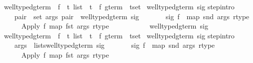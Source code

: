 \begin{isabellebody}
\isanewline
\isanewline
{}\ well{\isacharunderscore}typed{\isacharunderscore}gterm\ {\isacharcolon}{\isacharcolon}\ {\isachardoublequote}{\isacharparenleft}{\isacharprime}f\ {\isasymRightarrow}\ {\isacharprime}t\ list\ {\isacharasterisk}\ {\isacharprime}t{\isacharparenright}\ {\isasymRightarrow}\ {\isacharparenleft}{\isacharprime}f\ gterm\ {\isacharasterisk}\ {\isacharprime}t{\isacharparenright}set{\isachardoublequote}\isanewline
{}\ {\isachardoublequote}well{\isacharunderscore}typed{\isacharunderscore}gterm\ sig{\isachardoublequote}\isanewline
{}\isanewline
step{\isacharbrackleft}intro{\isacharbang}{\isacharbrackright}{\isacharcolon}\ \isanewline
\ \ \ \ {\isachardoublequote}{\isasymlbrakk}{\isasymforall}pair\ {\isasymin}\ set\ args{\isachardot}\ pair\ {\isasymin}\ well{\isacharunderscore}typed{\isacharunderscore}gterm\ sig{\isacharsemicolon}\ \isanewline
\ \ \ \ \ \ sig\ f\ {\isacharequal}\ {\isacharparenleft}map\ snd\ args{\isacharcomma}\ rtype{\isacharparenright}{\isasymrbrakk}\isanewline
\ \ \ \ \ {\isasymLongrightarrow}\ {\isacharparenleft}Apply\ f\ {\isacharparenleft}map\ fst\ args{\isacharparenright}{\isacharcomma}\ rtype{\isacharparenright}\ \isanewline
\ \ \ \ \ \ \ \ \ {\isasymin}\ well{\isacharunderscore}typed{\isacharunderscore}gterm\ sig{\isachardoublequote}\isanewline
\isanewline
{}\ well{\isacharunderscore}typed{\isacharunderscore}gterm{\isacharprime}\ {\isacharcolon}{\isacharcolon}\ {\isachardoublequote}{\isacharparenleft}{\isacharprime}f\ {\isasymRightarrow}\ {\isacharprime}t\ list\ {\isacharasterisk}\ {\isacharprime}t{\isacharparenright}\ {\isasymRightarrow}\ {\isacharparenleft}{\isacharprime}f\ gterm\ {\isacharasterisk}\ {\isacharprime}t{\isacharparenright}set{\isachardoublequote}\isanewline
{}\ {\isachardoublequote}well{\isacharunderscore}typed{\isacharunderscore}gterm{\isacharprime}\ sig{\isachardoublequote}\isanewline
{}\isanewline
step{\isacharbrackleft}intro{\isacharbang}{\isacharbrackright}{\isacharcolon}\ \isanewline
\ \ \ \ {\isachardoublequote}{\isasymlbrakk}args\ {\isasymin}\ lists{\isacharparenleft}well{\isacharunderscore}typed{\isacharunderscore}gterm{\isacharprime}\ sig{\isacharparenright}{\isacharsemicolon}\ \isanewline
\ \ \ \ \ \ sig\ f\ {\isacharequal}\ {\isacharparenleft}map\ snd\ args{\isacharcomma}\ rtype{\isacharparenright}{\isasymrbrakk}\isanewline
\ \ \ \ \ {\isasymLongrightarrow}\ {\isacharparenleft}Apply\ f\ {\isacharparenleft}map\ fst\ args{\isacharparenright}{\isacharcomma}\ rtype{\isacharparenright}\ \isanewline

\end{isabellebody}
